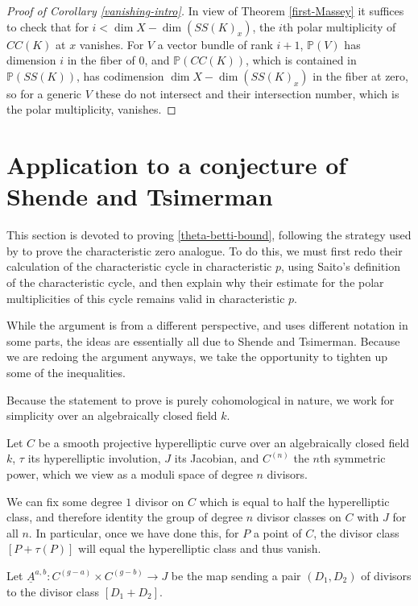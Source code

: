\documentclass[12pt]{amsart}
\theoremstyle{definition}
\theoremstyle{remark}
\begin{document}
\begin{proof}[Proof of Corollary \ref{vanishing-intro}] In view of Theorem \ref{first-Massey} it suffices to check that for $i< \dim X - \dim (SS(K)_x)$, the $i$th polar multiplicity of $CC(K)$ at $x$ vanishes.  For $V$ a vector bundle of rank $i+1$, $\mathbb P(V)$ has dimension $i$ in the fiber of $0$, and $\mathbb P( CC(K))$, which is contained in $\mathbb P( SS(K))$, has codimension $\dim X - \dim (SS(K)_x)$ in the fiber at zero, so for a generic $V$ these do not intersect and their intersection number, which is the polar multiplicity, vanishes. \end{proof}



\section{Application to a conjecture of Shende and Tsimerman}
This section is devoted to proving \ref{theta-betti-bound}, following the strategy used by \citet{TS} to prove the characteristic zero analogue. To do this, we must first redo their calculation of the characteristic cycle in characteristic $p$, using Saito's definition of the characteristic cycle, and then explain why their estimate for the polar multiplicities of this cycle remains valid in characteristic $p$. 

While the argument is from a different perspective, and uses different notation in some parts, the ideas are essentially all due to Shende and Tsimerman. Because we are redoing the argument anyways, we take the opportunity to tighten up some of the inequalities.

Because the statement to prove is purely cohomological in nature, we work for simplicity over an algebraically closed field $k$. 

 Let $C$ be a smooth projective hyperelliptic curve over an algebraically closed field $k$, $\tau$ its hyperelliptic involution, $J$ its Jacobian, and $C^{(n)}$ the $n$th symmetric power, which we view as a moduli space of degree $n$ divisors.
 
 We can fix some degree $1$ divisor on $C$ which is equal to half the hyperelliptic class, and therefore identity the group of degree $n$ divisor classes on $C$ with $J$ for all $n$. In particular, once we have done this, for $P$ a point of $C$, the divisor class $[P+ \tau(P)]$ will equal the hyperelliptic class and thus vanish.
 
 
Let $\underline{A}^{a,b}: C^{(g-a)} \times C^{(g-b)} \to J$ be the map sending a pair $(D_1,D_2)$ of divisors to the divisor class $[D_1+D_2]$.
\end{document}
